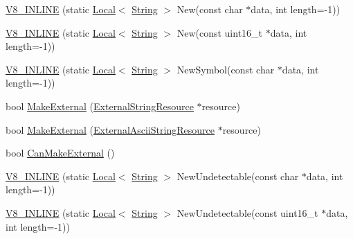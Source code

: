 \begin{DoxyCompactItemize}
\item 
\hyperlink{classv8_1_1_string_ab1d6072a742c825bf8d173da1da02412}{V8\+\_\+\+I\+N\+L\+I\+N\+E} (static \hyperlink{classv8_1_1_local}{Local}$<$ \hyperlink{classv8_1_1_string}{String} $>$ New(const char $\ast$data, int length=-\/1))
\item 
\hyperlink{classv8_1_1_string_a286a26a60bc761c3685b6edb732157e6}{V8\+\_\+\+I\+N\+L\+I\+N\+E} (static \hyperlink{classv8_1_1_local}{Local}$<$ \hyperlink{classv8_1_1_string}{String} $>$ New(const uint16\+\_\+t $\ast$data, int length=-\/1))
\item 
\hyperlink{classv8_1_1_string_a18090f5579aa1f29bf98229ead9921b8}{V8\+\_\+\+I\+N\+L\+I\+N\+E} (static \hyperlink{classv8_1_1_local}{Local}$<$ \hyperlink{classv8_1_1_string}{String} $>$ New\+Symbol(const char $\ast$data, int length=-\/1))
\item 
bool \hyperlink{classv8_1_1_string_a5efd1eba40c1fa8a6aae2c4a175a63be}{Make\+External} (\hyperlink{classv8_1_1_string_1_1_external_string_resource}{External\+String\+Resource} $\ast$resource)
\item 
bool \hyperlink{classv8_1_1_string_a19db11c97e2ce01244e06f5cbcd094f2}{Make\+External} (\hyperlink{classv8_1_1_string_1_1_external_ascii_string_resource}{External\+Ascii\+String\+Resource} $\ast$resource)
\item 
bool \hyperlink{classv8_1_1_string_a0fe076838af046506ffebbfadcde812a}{Can\+Make\+External} ()
\item 
\hyperlink{classv8_1_1_string_a6d0c3247f00596f3380b572341f95e02}{V8\+\_\+\+I\+N\+L\+I\+N\+E} (static \hyperlink{classv8_1_1_local}{Local}$<$ \hyperlink{classv8_1_1_string}{String} $>$ New\+Undetectable(const char $\ast$data, int length=-\/1))
\item 
\hyperlink{classv8_1_1_string_af1ab1a0e475a7d1f532a35e846c1fb61}{V8\+\_\+\+I\+N\+L\+I\+N\+E} (static \hyperlink{classv8_1_1_local}{Local}$<$ \hyperlink{classv8_1_1_string}{String} $>$ New\+Undetectable(const uint16\+\_\+t $\ast$data, int length=-\/1))
\end{DoxyCompactItemize}
